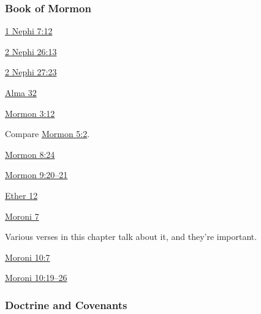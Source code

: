 	\subsubsection{Book of Mormon} %
		\label{FAITH-BOM}
	
		
		\begin{compactdesc}
			\item[{\hyperref[1NEPHI-7-12]{1 Nephi 7:12}}]
			\item[{\hyperref[2NEPHI-26-13]{2 Nephi 26:13}}]
			\item[{\hyperref[2NEPHI-27-23]{2 Nephi 27:23}}]
			\item[{\hyperref[ALMA-32]{Alma 32}}]
			\item[{\hyperref[MORMON-3-12]{Mormon 3:12}}] \phantom{.}
				\begin{compactitem}
					\item Compare \hyperref[MORMON-5-2]{Mormon 5:2}.
				\end{compactitem}
			\item[{\hyperref[MORMON-8-24]{Mormon 8:24}}]
			\item[{\hyperref[MORMON-9-20]{Mormon 9:20--21}}]
			\item[{\hyperref[ETHER-12]{Ether 12}}]
			\item[{\hyperref[MORONI-7]{Moroni 7}}] \phantom{.}
				\begin{compactitem}
					\item Various verses in this chapter talk about it, and they're important.
				\end{compactitem} 
			\item[{\hyperref[MORONI-10-7]{Moroni 10:7}}]
			\item[{\hyperref[MORONI-10-19]{Moroni 10:19--26}}]
		\end{compactdesc}
		
	\subsubsection{Doctrine and Covenants} %
		\label{FAITH-DC}
	
		
